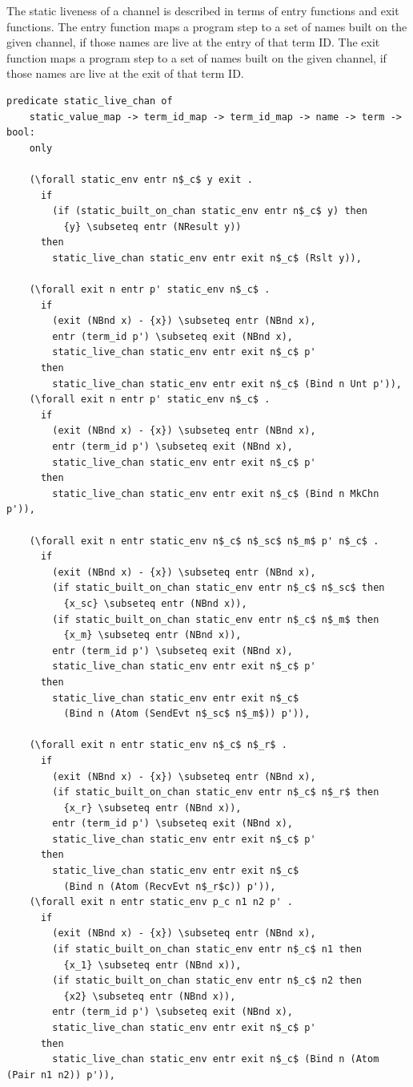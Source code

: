 \documentclass[10pt]{article}
\begin{document}
The static liveness of a channel is described in terms of entry functions and
exit functions. The entry function maps a program step to a set of names built on
the given channel, if those names are live at the entry of that term ID.
The exit function maps a program step to a
set of names built on the given channel, if those names are live at the exit of that
term ID.

\begin{lstlisting}[language=logic, mathescape]
  predicate static_live_chan of
    static_value_map -> term_id_map -> term_id_map -> name -> term -> bool:
    only

    (\forall static_env entr n$_c$ y exit .
      if
        (if (static_built_on_chan static_env entr n$_c$ y) then
          {y} \subseteq entr (NResult y))
      then
        static_live_chan static_env entr exit n$_c$ (Rslt y)),

    (\forall exit n entr p' static_env n$_c$ .
      if 
        (exit (NBnd x) - {x}) \subseteq entr (NBnd x),
        entr (term_id p') \subseteq exit (NBnd x),
        static_live_chan static_env entr exit n$_c$ p'
      then 
        static_live_chan static_env entr exit n$_c$ (Bind n Unt p')),
    (\forall exit n entr p' static_env n$_c$ .
      if
        (exit (NBnd x) - {x}) \subseteq entr (NBnd x),
        entr (term_id p') \subseteq exit (NBnd x),
        static_live_chan static_env entr exit n$_c$ p'
      then 
        static_live_chan static_env entr exit n$_c$ (Bind n MkChn p')),

    (\forall exit n entr static_env n$_c$ n$_sc$ n$_m$ p' n$_c$ .
      if
        (exit (NBnd x) - {x}) \subseteq entr (NBnd x),
        (if static_built_on_chan static_env entr n$_c$ n$_sc$ then
          {x_sc} \subseteq entr (NBnd x)),
        (if static_built_on_chan static_env entr n$_c$ n$_m$ then 
          {x_m} \subseteq entr (NBnd x)),
        entr (term_id p') \subseteq exit (NBnd x),
        static_live_chan static_env entr exit n$_c$ p'
      then
        static_live_chan static_env entr exit n$_c$
          (Bind n (Atom (SendEvt n$_sc$ n$_m$)) p')),

    (\forall exit n entr static_env n$_c$ n$_r$ .    
      if
        (exit (NBnd x) - {x}) \subseteq entr (NBnd x),
        (if static_built_on_chan static_env entr n$_c$ n$_r$ then
          {x_r} \subseteq entr (NBnd x)),
        entr (term_id p') \subseteq exit (NBnd x),
        static_live_chan static_env entr exit n$_c$ p'
      then
        static_live_chan static_env entr exit n$_c$
          (Bind n (Atom (RecvEvt n$_r$c)) p')),
    (\forall exit n entr static_env p_c n1 n2 p' .
      if
        (exit (NBnd x) - {x}) \subseteq entr (NBnd x),
        (if static_built_on_chan static_env entr n$_c$ n1 then
          {x_1} \subseteq entr (NBnd x)),
        (if static_built_on_chan static_env entr n$_c$ n2 then
          {x2} \subseteq entr (NBnd x)),
        entr (term_id p') \subseteq exit (NBnd x),
        static_live_chan static_env entr exit n$_c$ p'
      then
        static_live_chan static_env entr exit n$_c$ (Bind n (Atom (Pair n1 n2)) p')),


\end{lstlisting}
\end{document}
